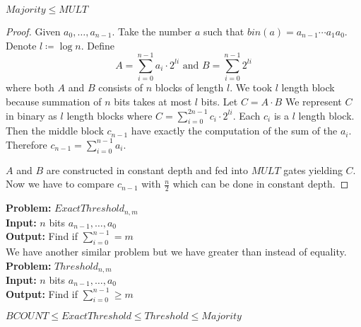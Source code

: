 \begin{theorem}\label{majmultrel}
	$Majority\leq MULT$
\end{theorem}
\begin{proof}
	Given $a_0,\dots,a_{n-1}$. Take the number $a$ such that $bin(a)=a_{n-1}\cdots a_1a_0$. Denote $l\coloneqq \log n$. Define $$A=\sum\limits_{i=0}^{n-1}a_i\cdot 2^{li}\text{ and }B=\sum\limits_{i=0}^{n-1}2^{li}$$where both $A$ and $B$ consists of $n$ blocks of length $l$. We took $l$ length block because summation of $n$ bits takes at most $l$ bits. Let $C=A\cdot B$ We represent $C$ in binary as $l$ length blocks where  $C=\sum\limits_{i=0}^{2n-1}c_i\cdot 2^{li}$. Each $c_i$ is a $l$ length block. Then the middle block $c_{n-1}$ have exactly the computation of the sum of the $a_i$. Therefore $c_{n-1}=\sum\limits_{i=0}^{n-1}a_i$.
	
	$A$ and $B$ are constructed in constant depth and fed into $MULT$ gates yielding $C$. Now we have to compare $c_{n-1}$ with $\frac{n}{2}$ which can be done in constant depth.
\end{proof}\parinf

\textbf{Problem:} $ExactThreshold_{n,m}$\\
\textbf{Input:} $n$ bits $a_{n-1},\dots, a_0$\\
\textbf{Output:} Find if $\sum\limits_{i=0}^{n-1}= m$\\[2mm]
We have another similar problem but we have greater than instead of equality.\\[2mm]
\textbf{Problem:} $Threshold_{n,m}$\\
\textbf{Input:} $n$ bits $a_{n-1},\dots, a_0$\\
\textbf{Output:} Find if $\sum\limits_{i=0}^{n-1}\geq m$\parinn

\begin{theorem}\label{bcthmajrel}
	$BCOUNT\leq ExactThreshold\leq Threshold\leq Majority$
\end{theorem}

